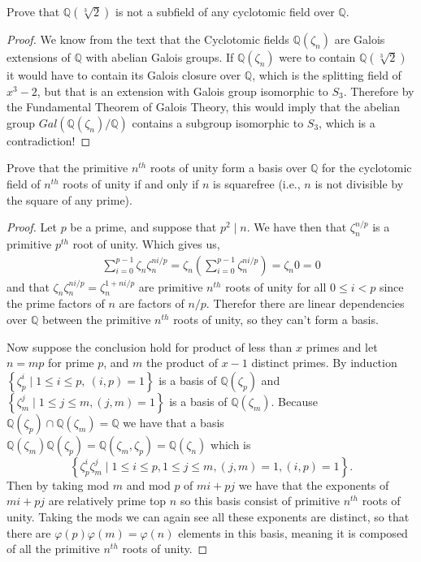 \documentclass[11pt]{article}
\newenvironment{problem}[2][Problem\!]{\begin{tcolorbox}\begin{trivlist}
\item[\hskip \labelsep {\bfseries #1}\hskip \labelsep {\bfseries #2}]}{\end{trivlist}\end{tcolorbox}}
\newcommand{\qq}{\mathbb Q}   %
\newcommand{\set}[1]{\left\{#1\right\}} %
\renewcommand{\phi}{\varphi}
\renewcommand{\leq}{\leqslant}
\newcommand{\lrp}[1]{\left(#1\right)}
\begin{document}
\vspace*{15pt}

\begin{problem}{14.5.10}
    Prove that $\qq(\sqrt[3]{2})$ is not a subfield of any cyclotomic field over $\qq$. 
\end{problem}
\begin{proof}
    We know from the text that the Cyclotomic fields $\qq(\zeta_n)$ are Galois extensions of $\qq$ with abelian Galois groups. If $\qq(\zeta_n)$ were to contain $\qq(\sqrt[3]{2})$ it would have to contain its Galois closure over $\qq$, which is the splitting field of $x^{3} -2$, but that is an extension with Galois group isomorphic to $S_3$. Therefore by the Fundamental Theorem of Galois Theory, this would imply that the abelian group $Gal(\qq(\zeta_n)/\qq)$ contains a subgroup isomorphic to $S_3$, which is a contradiction!
\end{proof}

\vspace*{15pt}

\begin{problem}{14.5.11}
    Prove that the primitive $n^{th}$ roots of unity form a basis over $\qq$ for the cyclotomic field of $n^{th}$ roots of unity if and only if $n$ is squarefree (i.e., $n$ is not divisible by the square of any prime). 
\end{problem}
\begin{proof}
    Let $p$ be a prime, and suppose that $p^{2}\mid n$. We have then that $\zeta_n^{n/p}$ is a primitive $p^{th}$ root of unity. Which gives us,
    \begin{align*}
        \sum_{i = 0}^{p -1}\zeta_n\zeta_n^{n i/p} = \zeta_n\lrp{\sum_{i = 0}^{p-1}\zeta_n^{n i/p}} = \zeta_n 0 = 0
    \end{align*}
    and that $\zeta_n\zeta_n^{n i/p} = \zeta_n^{1 + n i/p}$ are primitive $n^{th}$ roots of unity for all $0 \leq i < p$ since the prime factors of $n$ are factors of $n/p$.  Therefor there are linear dependencies over $\qq$ between the primitive $n^{th}$ roots of unity, so they can't form a basis. 

    Now suppose the conclusion hold for product of less than $x$ primes and let $n = mp$ for prime $p$, and $m$ the product of $x-1$ distinct primes. By induction $\set{\zeta_p^{i}\mid 1 \leq i \leq p, \ (i,p) =1}$ is a basis of $\qq(\zeta_p)$ and $\set{\zeta_m^{j} \mid 1 \leq j \leq m, (j,m) =1}$ is a basis of $\qq(\zeta_m)$. Because $\qq(\zeta_p)\cap \qq(\zeta_m) = \qq$ we have that a basis $\qq(\zeta_m)\qq(\zeta_p) = \qq(\zeta_m, \zeta_p) = \qq(\zeta_n)$ which is \[\set{\zeta_p^{i}\zeta_m^{j} \mid 1 \leq i \leq p, 1 \leq j \leq m, (j,m) =1, (i,p) = 1}.\]
    Then by taking mod $m$ and mod $p$ of $mi + pj$ we have that the exponents of $mi + pj$ are relatively prime top $n$ so this basis consist of primitive $n^{th}$ roots of unity. Taking the mods we can again see all these exponents are distinct, so that there are $\phi(p)\phi(m) = \phi(n)$ elements in this basis, meaning it is composed of all the primitive $n^{th}$ roots of unity.   
\end{proof}
\end{document}
